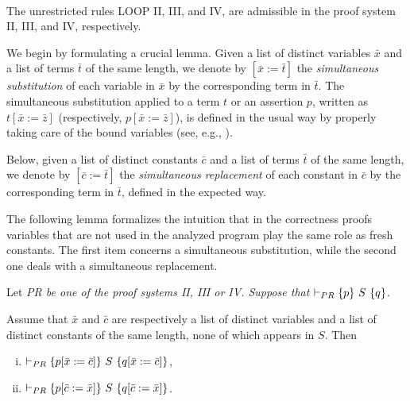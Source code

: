 \documentclass[runningheads]{llncs}       %
\begin{document}


\begin{theorem} \label{thm:book}
\mbox{} \\
The unrestricted  rules LOOP II, III, and IV, are  admissible in the proof system II, III, and IV, respectively.
\end{theorem}

We begin by formulating a crucial lemma.
Given a list of distinct variables $\bar{x}$ and a list of terms
$\bar{t}$ of the same length, we denote by $[\bar{x} := \bar{t}]$ the
\emph{simultaneous substitution} of each variable in $\bar{x}$ by the
corresponding term in $\bar{t}$. The simultaneous substitution applied
to a term $t$ or an assertion $p$, written as $t[\bar{x} := \bar{z}]$
(respectively, $p[\bar{x} := \bar{z}]$), is defined in the usual way
by properly taking care of the bound variables (see, e.g.,
\cite[Subsection 2.7]{ABO09}).

Below, given a list of distinct constants $\bar{c}$ and a list of
terms $\bar{t}$ of the same length, we denote by
$[\bar{c} := \bar{t}]$ the \emph{simultaneous replacement} of each
constant in $\bar{c}$ by the corresponding term in $\bar{t}$, defined
in the expected way.

The following lemma formalizes the intuition that in the correctness
proofs variables that are not used in the analyzed program play the
same role as fresh constants. The first item concerns a simultaneous
substitution, while the second one deals with a simultaneous
replacement.

\begin{lemma} \label{lem:z}

  Let \it{PR} be one of the proof systems II, III or IV.  Suppose
  that $\vdash_{PR} \mbox{$\{{p}\}\ {S}\ \{{q}\}$}$.

Assume that $\bar{x}$ and $\bar{c}$ are respectively a list of distinct variables and a list
of distinct constants of the same length, none of which appears in $S$.
Then
\begin{enumerate}[(i)]
\item $\vdash_{PR} \mbox{$\{{p[\bar{x} := \bar{c}]}\}\ {S}\ \{{q[\bar{x} := \bar{c}]}\}$}$,

\item $\vdash_{PR} \mbox{$\{{p[\bar{c} := \bar{x}]}\}\ {S}\ \{{q[\bar{c} := \bar{x}]}\}$}$.
\end{enumerate}

\end{lemma}
\end{document}
